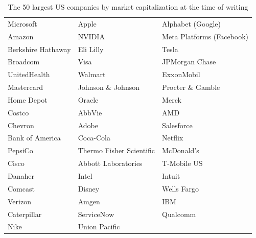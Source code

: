 \begin{table}[H]
    \centering
    \begin{tabular}{|l l l|}
        \hline
        Microsoft & Apple & Alphabet (Google) \\
        Amazon & NVIDIA & Meta Platforms (Facebook) \\
        Berkshire Hathaway & Eli Lilly & Tesla \\
        Broadcom & Visa & JPMorgan Chase \\
        UnitedHealth & Walmart & ExxonMobil \\
        Mastercard & Johnson \& Johnson & Procter \& Gamble \\
        Home Depot & Oracle & Merck \\
        Costco & AbbVie & AMD \\
        Chevron & Adobe & Salesforce \\
        Bank of America & Coca-Cola & Netflix \\
        PepsiCo & Thermo Fisher Scientific & McDonald's \\
        Cisco & Abbott Laboratories & T-Mobile US \\
        Danaher & Intel & Intuit \\
        Comcast & Disney & Wells Fargo \\
        Verizon & Amgen & IBM \\
        Caterpillar & ServiceNow & Qualcomm \\
        Nike & Union Pacific & \\
        \hline
    \end{tabular}
    \caption{The 50 largest US companies by market capitalization at the time of writing}
    \label{table:companies}
\end{table}


